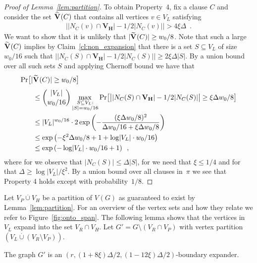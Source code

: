 \documentclass{theoretics}
\providecommand{\abs}[1]{\lvert#1\rvert}
\providecommand{\Abs}[1]{\bigl\lvert#1\bigr\rvert}
\newcommand{\Prob}[2][]{\Pr_{#1} \bigl[ #2 \bigr]}
\newcommand{\Setsize}[1]{\bigl\lvert#1\bigr\rvert}
\newcommand{\setsize}[1]{\lvert#1\rvert}
\newcommand{\disjointunion}{\overset{.}{\cup}}
\newcommand{\eqperiod}{\enspace .}
\newcommand{\eqcomma}{\enspace ,}
\newcommand{\reffig}[1]{Figure~\ref{#1}}
\newcommand{\refthm}[1]{Theorem~\ref{#1}}
\newcommand{\refpi}{\pi}
\newcommand{\neigh}[2][]{N_{{#1}}(#2)}
\newcommand{\diff}{\xi}
\newcommand{\GdegMax}{\Delta}
\newcommand{\V}[1][]{V_{#1}}
\newcommand{\Vl}{\V[L]}
\newcommand{\Vr}{\V[R]}
\newcommand{\Vp}{\V[P]}
\newcommand{\Vh}{\V[H]}
\newcommand{\Gprime}{G'}
\newcommand{\GprimeConstantDeg}{8}
\newcommand{\GprimeConstantExp}{12}
\newcommand{\Vbad}[2][]{\widetilde V^{#1}(#2)}
\numberwithin{equation}{section}
\begin{document}
\begin{proof}[Proof of Lemma~\ref{lem:partition}]
  To obtain Property~4, fix a clause $C$ and consider the set 
  ${\mathbf{\Vbad{ \mathnormal{C} } }}$ that contains
  all vertices $v\in \Vl$ satisfying
  \begin{align}
    \Abs{ \abs{ \neigh[C]{v} \cap {\mathbf{\Vh}} } - 
    1/2\abs{ \neigh[C]{v} } } > 
    4 \diff \GdegMax \eqperiod
  \end{align}
  We want to show that it is unlikely 
  that $\setsize{\mathbf{\Vbad{ \mathnormal{C} } }} \geq w_0/8$.
  Note that such a large $\mathbf{\Vbad{ \mathnormal{C} } }$
  implies by Claim~\ref{cl:non_expansion} that there
  is a set $S \subseteq \Vl$ of size $w_0/16$
  such that 
  $\Setsize{ \setsize{ \neigh[C]{S} \cap \mathbf{\Vh} } - 
    1/2\abs{ \neigh[C]{ S }}}
  \ge
  2 \diff \GdegMax \setsize{ S }$.
  By a union bound over all such sets $S$
  and applying Chernoff bound\ifthenelse{\boolean{false}}{}{~(\refthm{thm:Chernoff})} 
  we have that
  \begin{align}\nonumber
    \Prob{\setsize{&\mathbf{\Vbad{ \mathnormal{C} } }} \geq w_0/8}\\
      & \leq
        \binom{\setsize{\Vl}}{w_0/16} 
        \max_{\substack{S \subseteq \Vl:\\ \setsize{S}=w_0/16}}
    \Prob{\Setsize{ \setsize{ \neigh[C]{S} \cap \mathbf{\Vh} } - 
    1/2\abs{ \neigh[C]{ S }}}
    \ge
    \diff \GdegMax w_0/8 }\\ 
    \label{eq:part_one}
      & \leq
        \setsize{\Vl}^{w_0/16} \cdot 
        2 \exp\left( -
        \frac{(\diff \GdegMax w_0/8 )^2}{ \GdegMax w_0/16 + 
        \diff \GdegMax w_0/8  }\right) \\ 
    \label{eq:part_two}
      & \leq
        \exp\left({- \diff^2 \GdegMax w_0/8 }+ 1 + 
        \log \setsize{\Vl} \cdot  w_0/16\right) \\ 
    \label{eq:part_three}
      & \leq
        \exp\left(-\log \setsize{\Vl} \cdot w_0/16 + 1 \right)
        \eqcomma
  \end{align}
  where for  we observe that
  $\abs{ \neigh[C]{ S }} \leq \GdegMax \setsize{S}$, for 
   we need that $\diff \leq 1 / 4$
  and for  that
  ${\GdegMax \geq \log \setsize{\Vl}/\diff^2}$. 
  By a union bound over all clauses in~$\refpi$ we see
  that Property 4 holds except with probability~$1/8$.
\end{proof}


Let $\Vp \disjointunion \Vh$ be a partition of $\V(G)$ as 
guaranteed to exist by Lemma~\ref{lem:partition}. For an overview of the
vertex sets and how they relate we refer to \reffig{fig:onto_span}.
The following lemma shows that the vertices in $\Vl$ expand into the
set $\Vr \cap \Vh$. Let $\Gprime = G \setminus (\Vr \cap \Vp)$ 
with vertex partition $(\Vl \disjointunion (\Vr\setminus\Vp))$.
\begin{lemma}\label{lem:expansion_Gprime}
  The graph $\Gprime$ is an
  $(r, (1 + \GprimeConstantDeg \diff) \GdegMax/2, 
  (1 - \GprimeConstantExp \diff) \GdegMax/2)$-boundary 
  expander. 
\end{lemma}
\end{document}
